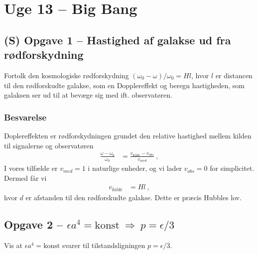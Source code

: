 \documentclass[../main.tex]{subfiles}
\begin{document}

\section{Uge 13 -- Big Bang}
\setcounter{section}{13}



\subsection{(S) Opgave 1 -- Hastighed af galakse ud fra rødforskydning}
\setcounter{subsection}{1}
\setcounter{equation}{0}

Fortolk den kosmologiske rødforskydning $(\omega_0 - \omega)/\omega_0 = H l$, hvor $l$ er distancen til den rødforskudte galakse, som en Dopplereffekt og beregn hastigheden, som galaksen ser ud til at bevæge sig med ift. observatøren.


\subsubsection*{Besvarelse}

Doplereffekten er rødforskydningen grundet den relative hastighed mellem kilden til signalerne og observatøren
\begin{align}
    \frac{\omega - \omega_0}{\omega_0} &= \frac{v_{kilde} - v_{obs}}{v_{med}} \: ,
\end{align}
I vores tilfælde er $v_{med} = 1$ i naturlige enheder, og vi lader $v_{obs} = 0$ for simplicitet. Dermed får vi
\begin{align}
    v_{kilde} &= H l \: ,
\end{align}
hvor $d$ er afstanden til den rødforskudte galakse. Dette er præcis Hubbles lov.




\subsection{Opgave 2 -- $\epsilon a^4 = \text{konst} \: \Rightarrow \: p = \epsilon/3$}
\setcounter{subsection}{2}
\setcounter{equation}{0}

Vis at $\epsilon a^4 = \text{konst}$ svarer til tilstandsligningen $p = \epsilon/3$.
\end{document}
